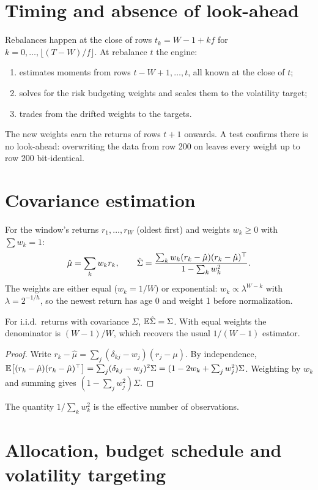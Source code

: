 \section{Timing and absence of look-ahead}
Rebalances happen at the close of rows $t_k=W-1+kf$ for $k=0,\dots,\lfloor(T-W)/f\rfloor$.
At rebalance $t$ the engine:
\begin{enumerate}
  \item estimates moments from rows $t-W+1,\dots,t$, all known at the close of $t$;
  \item solves for the risk budgeting weights and scales them to the volatility target;
  \item trades from the drifted weights to the targets.
\end{enumerate}
The new weights earn the returns of rows $t+1$ onwards. A test confirms there is no
look-ahead: overwriting the data from row 200 on leaves every weight up to row 200
bit-identical.

\section{Covariance estimation}
For the window's returns $r_1,\dots,r_W$ (oldest first) and weights $w_k\ge0$ with
$\sum w_k=1$:
\[
  \hat\mu=\sum_kw_kr_k,\qquad
  \hat\Sigma=\frac{\sum_kw_k(r_k-\hat\mu)(r_k-\hat\mu)^\top}{1-\sum_kw_k^2}.
\]
The weights are either equal ($w_k=1/W$) or exponential: $w_k\propto\lambda^{W-k}$ with
$\lambda=2^{-1/h}$, so the newest return has age 0 and weight 1 before normalization.

\begin{proposition}
For i.i.d.\ returns with covariance $\Sigma$, $\mathbb{E}\hat\Sigma=\Sigma$. With equal weights the
denominator is $(W-1)/W$, which recovers the usual $1/(W-1)$ estimator.
\end{proposition}
\begin{proof}
Write $r_k-\hat\mu=\sum_j(\delta_{kj}-w_j)(r_j-\mu)$. By independence,
$\mathbb{E}\big[(r_k-\hat\mu)(r_k-\hat\mu)^\top\big]=\sum_j(\delta_{kj}-w_j)^2\Sigma=(1-2w_k+\sum_jw_j^2)\Sigma$.
Weighting by $w_k$ and summing gives $(1-\sum_jw_j^2)\Sigma$.
\end{proof}
The quantity $1/\sum_kw_k^2$ is the effective number of observations.

\section{Allocation, budget schedule and volatility targeting}
